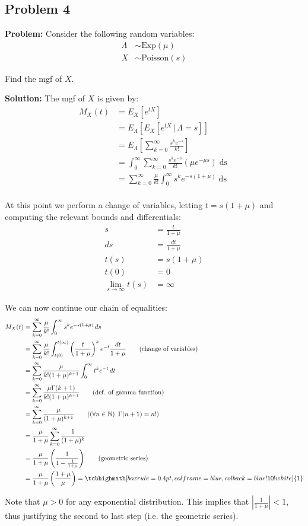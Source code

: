 \documentclass{article}
\newcommand*\pbar[0]{\,|\,}
\begin{document}
\subsection*{Problem 4}
\noindent\textbf{Problem:} Consider the following random variables:
\begin{align*}
    \Lambda&\sim \text{Exp}(\mu)\\
    X &\sim \text{Poisson}(s)
\end{align*}

Find the mgf of $X$.
\bigskip

\noindent\textbf{Solution:} The mgf of $X$ is given by:
\begin{align*}
    M_X(t)&=E_X[e^{tX}]\tag{def. of mgf}\\
    &=E_\Lambda[E_X[e^{tX}\pbar \Lambda=s]]\\
    &=E_\Lambda\left[\sum_{k=0}^\infty\frac{s^ke^{-s}}{k!}\right]\tag{def. of expectation}\\
    &=\int_0^\infty\sum_{k=0}^\infty\frac{s^ke^{-s}}{k!}(\mu e^{-\mu s})\mathop{ds}\tag{def. of expectation}\\
    &=\sum_{k=0}^\infty\frac{\mu}{k!}\int_0^\infty s^ke^{-s(1+\mu)}\mathop{ds}\tag{linearity of sum \& integral}\\
\end{align*}

At this point we perform a change of variables, letting $t=s(1+\mu)$ and computing the relevant bounds and differentials:
\begin{align*}
    s&=\frac{t}{1+\mu}\\
    ds&=\frac{dt}{1+\mu}\\
    t(s)&=s(1+\mu)\\
    t(0)&=0\\
    \lim_{s\to\infty} t(s)&=\infty
\end{align*}

We can now continue our chain of equalities:
\begin{align*}
    M_X(t)&=\sum_{k=0}^\infty\frac{\mu}{k!}\int_0^\infty s^ke^{-s(1+\mu)}\mathop{ds}\\
    &=\sum_{k=0}^\infty\frac{\mu}{k!}\int_{t(0)}^{t(\infty)} \left(\frac{t}{1+\mu}\right)^ke^{-t}\frac{dt}{1+\mu}\tag{change of variables}\\
    &=\sum_{k=0}^\infty\frac{\mu}{k!(1+\mu)^{k+1}}\int_0^\infty t^ke^{-t}\mathop{dt}\\
    &=\sum_{k=0}^\infty\frac{\mu\Gamma(k+1)}{k!(1+\mu)^{k+1}}\tag{def. of gamma function}\\
    &=\sum_{k=0}^\infty\frac{\mu}{(1+\mu)^{k+1}}\tag{$(\forall n\in\mathbb N)\,\,\,\Gamma(n+1)=n!$}\\
    &=\frac{\mu}{1+\mu}\sum_{k=0}^\infty\frac{1}{(1+\mu)^{k}}\\
    &=\frac{\mu}{1+\mu}\left(\frac{1}{1-\frac{1}{1+\mu}}\right)\tag{geometric series}\\
    &=\frac{\mu}{1+\mu}\left(\frac{1+\mu}{\mu}\right)=\tcbhighmath[boxrule=0.4pt,colframe=blue,colback=blue!10!white]{1}
\end{align*}

Note that $\mu>0$ for any exponential distribution. This implies that $\left|\frac{1}{1+\mu}\right|<1$, thus justifying the second to last step (i.e. the geometric series).
\end{document}
